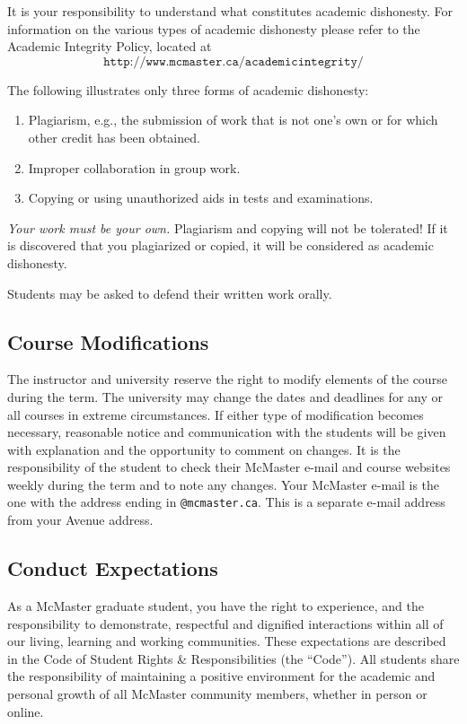 \documentclass[12pt]{article}
\newcommand{\be}{\begin{enumerate}}
\newcommand{\ee}{\end{enumerate}}
\begin{document}
It is your responsibility to understand what constitutes academic dishonesty.
For information on the various types of academic dishonesty please refer to the
Academic Integrity Policy, located at
\[\texttt{http://www.mcmaster.ca/academicintegrity/}\]

\noindent The following illustrates only three forms of academic dishonesty:

\be

\item Plagiarism, e.g., the submission of work that is not one's own or for
  which other credit has been obtained.

\item Improper collaboration in group work.

\item Copying or using unauthorized aids in tests and examinations.

  \ee

\emph{Your work must be your own.}  Plagiarism and copying will not be
tolerated!  If it is discovered that you plagiarized or copied, it
will be considered as academic dishonesty.

Students may be asked to defend their written work orally.

\subsection*{Course Modifications}

The instructor and university reserve the right to modify elements of
the course during the term.  The university may change the dates and
deadlines for any or all courses in extreme circumstances.  If either
type of modification becomes necessary, reasonable notice and
communication with the students will be given with explanation and the
opportunity to comment on changes. It is the responsibility of the
student to check their McMaster e-mail and course websites weekly
during the term and to note any changes.  Your McMaster e-mail is the
one with the address ending in \texttt{@mcmaster.ca}.  This is a
separate e-mail address from your Avenue address.

\subsection*{Conduct Expectations}

As a McMaster graduate student, you have the right to experience, and the
responsibility to demonstrate, respectful and dignified interactions within all
of our living, learning and working communities. These expectations are
described in the Code of Student Rights \& Responsibilities (the ``Code''). All
students share the responsibility of maintaining a positive environment for the
academic and personal growth of all McMaster community members, whether in
person or online.
\end{document}
